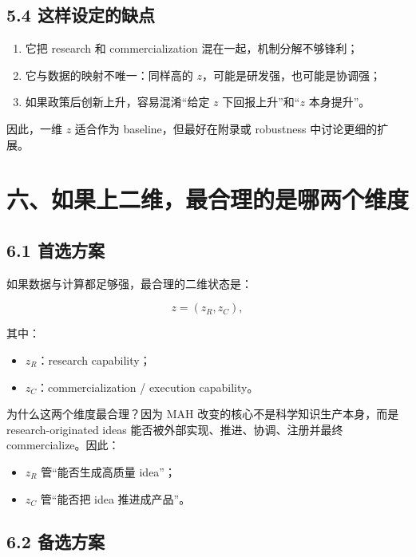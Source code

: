 \documentclass[12pt]{ctexart}
\begin{document}
\subsection{5.4 这样设定的缺点}

\begin{enumerate}[leftmargin=2em]
    \item 它把 research 和 commercialization 混在一起，机制分解不够锋利；
    \item 它与数据的映射不唯一：同样高的 \(z\)，可能是研发强，也可能是协调强；
    \item 如果政策后创新上升，容易混淆“给定 \(z\) 下回报上升”和“\(z\) 本身提升”。
\end{enumerate}

因此，一维 \(z\) 适合作为 baseline，但最好在附录或 robustness 中讨论更细的扩展。

\section{六、如果上二维，最合理的是哪两个维度}

\subsection{6.1 首选方案}

如果数据与计算都足够强，最合理的二维状态是：

\[
z=(z_R,z_C),
\]

其中：

\begin{itemize}[leftmargin=2em]
    \item \(z_R\)：research capability；
    \item \(z_C\)：commercialization / execution capability。
\end{itemize}

为什么这两个维度最合理？因为 MAH 改变的核心不是科学知识生产本身，而是 research-originated ideas 能否被外部实现、推进、协调、注册并最终 commercialize。因此：

\begin{itemize}[leftmargin=2em]
    \item \(z_R\) 管“能否生成高质量 idea”；
    \item \(z_C\) 管“能否把 idea 推进成产品”。
\end{itemize}

\subsection{6.2 备选方案}
\end{document}
